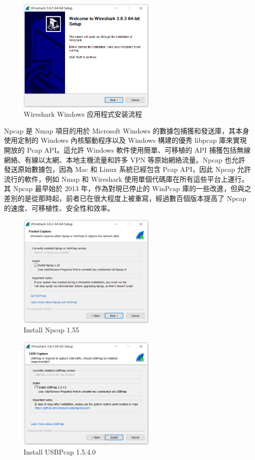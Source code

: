 \begin{figure}[htb]
\centering 
\includegraphics[width=0.60\textwidth]{img/ch1s1m2.png} 
\caption{Wireshark Windows 应用程式安装流程}
\label{Test}
\end{figure}

Npcap 是 Nmap 項目的用於 Microsoft Windows 的數據包捕獲和發送庫，其本身使用定制的 Windows 內核驅動程序以及 Windows 構建的優秀 libpcap 庫來實現開放的 Pcap API。這允許 Windows 軟件使用簡單、可移植的 API 捕獲包括無線網絡、有線以太網、本地主機流量和許多 VPN 等原始網絡流量。Npcap 也允許發送原始數據包，因為 Mac 和 Linux 系統已經包含 Pcap API，因此 Npcap 允許流行的軟件，例如 Nmap 和 Wireshark 使用單個代碼庫在所有這些平台上運行。其 Npcap 最早始於 2013 年，作為對現已停止的 WinPcap 庫的一些改進，但與之差別的是從那時起，前者已在很大程度上被重寫，經過數百個版本提高了 Npcap 的速度、可移植性、安全性和效率。

\begin{figure}[htb]
\centering 
\includegraphics[width=0.60\textwidth]{img/ch1s1m3.png} 
\caption{Install Npcap 1.55}
\label{Test}
\end{figure}

\begin{figure}[htb]
\centering 
\includegraphics[width=0.60\textwidth]{img/ch1s1m4.png} 
\caption{Install USBPcap 1.5.4.0}
\label{Test}
\end{figure}

